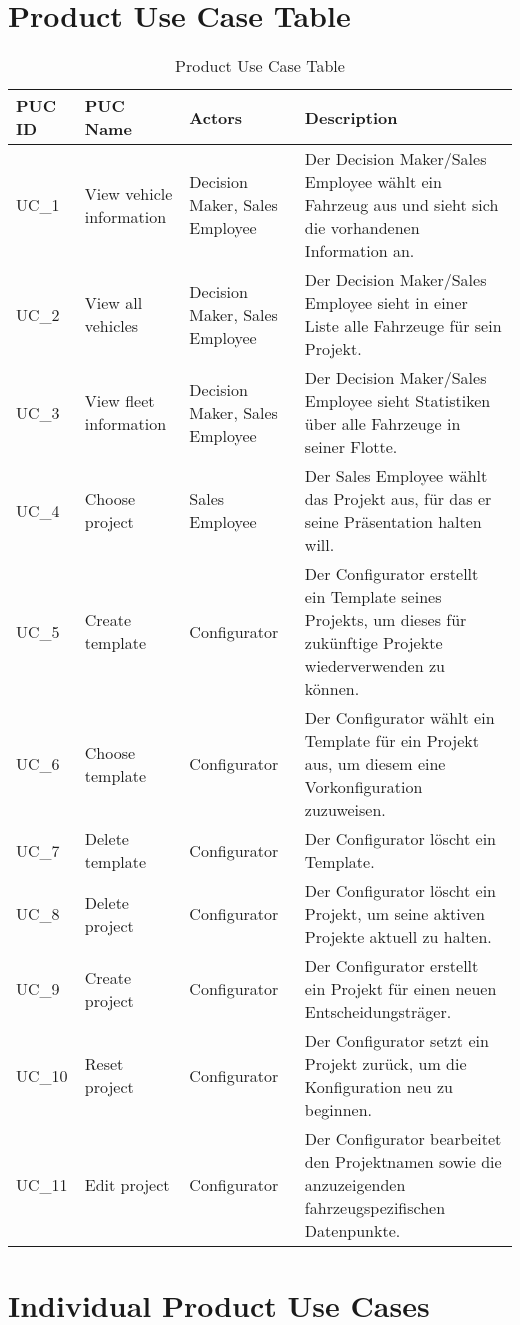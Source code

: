 \section{Product Use Case Table}
\sffamily
\begin{footnotesize}
  \renewcommand{\arraystretch}{1.4}
  \begin{longtable}[i i i L]{ p{} p{} p{} p{} }
    \caption                       %
        {Product Use Case Table} %
        \\
    \toprule
    \textbf{PUC ID} & \textbf{PUC Name} & \textbf{Actors}  & \textbf{Description}\\
    \midrule
    UC\_1 & View vehicle information & Decision Maker, Sales Employee & Der Decision Maker/Sales Employee wählt ein Fahrzeug aus und sieht sich die vorhandenen Information an. \\
    UC\_2 & View all vehicles & Decision Maker, Sales Employee & Der Decision Maker/Sales Employee sieht in einer Liste alle Fahrzeuge für sein Projekt. \\
    UC\_3 & View fleet information & Decision Maker, Sales Employee & Der Decision Maker/Sales Employee sieht Statistiken über alle Fahrzeuge in seiner Flotte. \\
    UC\_4 & Choose project & Sales Employee & Der Sales Employee wählt das Projekt aus, für das er seine Präsentation halten will. \\
    UC\_5 & Create template & Configurator & Der Configurator erstellt ein Template seines Projekts, um dieses für zukünftige Projekte wiederverwenden zu können. \\
    UC\_6 & Choose template & Configurator & Der Configurator wählt ein Template für ein Projekt aus, um diesem eine Vorkonfiguration zuzuweisen. \\
    UC\_7 & Delete template & Configurator & Der Configurator löscht ein Template. \\
    UC\_8 & Delete project & Configurator & Der Configurator löscht ein Projekt, um seine aktiven Projekte aktuell zu halten. \\
    UC\_9 & Create project & Configurator & Der Configurator erstellt ein Projekt für einen neuen Entscheidungsträger. \\
    UC\_10 & Reset project & Configurator & Der Configurator setzt ein Projekt zurück, um die Konfiguration neu zu beginnen. \\
    UC\_11 & Edit project & Configurator & Der Configurator bearbeitet den Projektnamen sowie die anzuzeigenden fahrzeugspezifischen Datenpunkte. \\
    \bottomrule
  \end{longtable}
\end{footnotesize}
\rmfamily

\section{Individual Product Use Cases}
